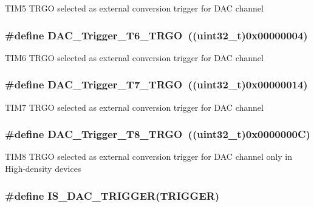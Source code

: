 \label{group__DAC__trigger__selection_ga35352cebfd1ae8a3d63e374a5d86a85d}
TIM5 TRGO selected as external conversion trigger for DAC channel \hypertarget{group__DAC__trigger__selection_ga083307783678a2f1d3066db57dc84cfe}{
\subsubsection[{DAC\_\-Trigger\_\-T6\_\-TRGO}]{\setlength{\rightskip}{0pt plus 5cm}\#define DAC\_\-Trigger\_\-T6\_\-TRGO~((uint32\_\-t)0x00000004)}}
\label{group__DAC__trigger__selection_ga083307783678a2f1d3066db57dc84cfe}
TIM6 TRGO selected as external conversion trigger for DAC channel \hypertarget{group__DAC__trigger__selection_ga9b92d497746be54af46ae4e9c1fc4a6f}{
\subsubsection[{DAC\_\-Trigger\_\-T7\_\-TRGO}]{\setlength{\rightskip}{0pt plus 5cm}\#define DAC\_\-Trigger\_\-T7\_\-TRGO~((uint32\_\-t)0x00000014)}}
\label{group__DAC__trigger__selection_ga9b92d497746be54af46ae4e9c1fc4a6f}
TIM7 TRGO selected as external conversion trigger for DAC channel \hypertarget{group__DAC__trigger__selection_ga756700c6621eadb807e21a16966580a0}{
\subsubsection[{DAC\_\-Trigger\_\-T8\_\-TRGO}]{\setlength{\rightskip}{0pt plus 5cm}\#define DAC\_\-Trigger\_\-T8\_\-TRGO~((uint32\_\-t)0x0000000C)}}
\label{group__DAC__trigger__selection_ga756700c6621eadb807e21a16966580a0}
TIM8 TRGO selected as external conversion trigger for DAC channel only in High-\/density devices \hypertarget{group__DAC__trigger__selection_ga4409b79639e6ae3b1f0ed61a33c810a3}{
\subsubsection[{IS\_\-DAC\_\-TRIGGER}]{\setlength{\rightskip}{0pt plus 5cm}\#define IS\_\-DAC\_\-TRIGGER(TRIGGER)}}
